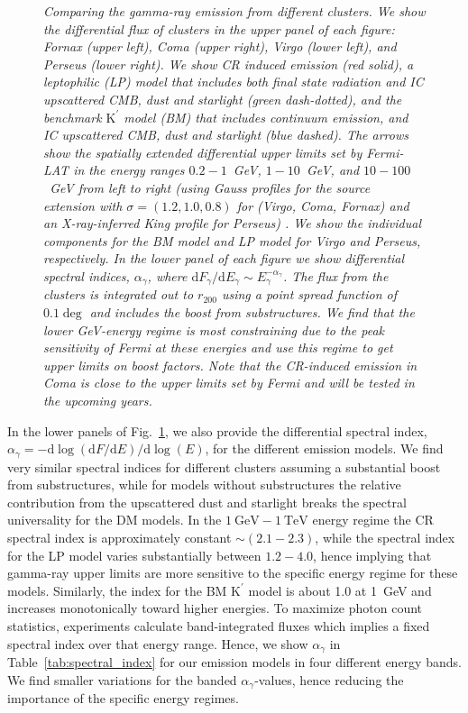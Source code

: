 \documentclass[10pt,aps,pra,reprint,amsmath,amsfonts,amssymb,showpacs,nofootinbib,floatfix]{revtex4-1}
\newcommand{\Fermi}{{\em Fermi}\xspace}
\newcommand{\rmn}{\mathrm}
\newcommand{\Kp}{\rmn{K}^\prime}
\newcommand{\gev}{\rmn{GeV}}
\newcommand{\tev}{\rmn{TeV}}
\newcommand{\dd}{\rmn{d}}
\newcommand{\rvir}{r_{200}}
\begin{document}
\begin{figure}
\begin{minipage}{2.0\columnwidth}
\caption{\it Comparing the gamma-ray emission from different
  clusters. We show the differential flux of clusters in the upper
  panel of each figure: Fornax (upper left), Coma (upper right), Virgo
  (lower left), and Perseus (lower right). We show CR induced emission
  (red solid), a leptophilic (LP) model that includes both final state
  radiation and IC upscattered CMB, dust and starlight (green
  dash-dotted), and the benchmark $\Kp$ model (BM) that includes
  continuum emission, and IC upscattered CMB, dust and starlight (blue
  dashed). The arrows show the spatially extended differential upper
  limits set by \Fermi-LAT in the energy ranges $0.2-1$~GeV,
  $1-10$~GeV, and $10-100$~GeV from left to right (using Gauss
  profiles for the source extension with $\sigma=(1.2,1.0,0.8)$ for
  (Virgo, Coma, Fornax) and an X-ray-inferred King profile for
  Perseus) \cite{2010ApJ...717L..71A}. We show the individual
  components for the BM model and LP model for Virgo and Perseus,
  respectively. In the lower panel of each figure we show differential
  spectral indices, $\alpha_\gamma$, where $\dd F_\gamma/\dd E_\gamma
  \sim E_\gamma^{-\alpha_\gamma}$. The flux from the clusters is
  integrated out to $\rvir$ using a point spread function of $0.1\deg$
  and includes the boost from substructures. We find that the lower
  GeV-energy regime is most constraining due to the peak sensitivity
  of \Fermi at these energies and use this regime to get upper limits
  on boost factors. Note that the CR-induced emission in Coma is close
  to the upper limits set by \Fermi and will be tested in the upcoming
  years.}
 \label{fig:clu_comp}
\end{minipage}
\end{figure}

In the lower panels of Fig.~\ref{fig:clu_comp}, we also provide the
differential spectral index, $\alpha_\gamma=-\dd \log(\dd F/\dd E)/\dd
\log(E)$, for the different emission models. We find very similar
spectral indices for different clusters assuming a substantial boost
from substructures, while for models without substructures the
relative contribution from the upscattered dust and starlight breaks
the spectral universality for the DM models. In the $1~\gev-1~\tev$
energy regime the CR spectral index is approximately constant $\sim
(2.1-2.3)$, while the spectral index for the LP model varies
substantially between $1.2-4.0$, hence implying that gamma-ray upper
limits are more sensitive to the specific energy regime for these
models. Similarly, the index for the BM $\Kp$ model is about 1.0 at
1~GeV and increases monotonically toward higher energies. To maximize
photon count statistics, experiments calculate band-integrated fluxes
which implies a fixed spectral index over that energy range. Hence, we
show $\alpha_\gamma$ in Table~\ref{tab:spectral_index} for our
emission models in four different energy bands. We find smaller
variations for the banded $\alpha_\gamma$-values, hence reducing the
importance of the specific energy regimes.
\end{document}
